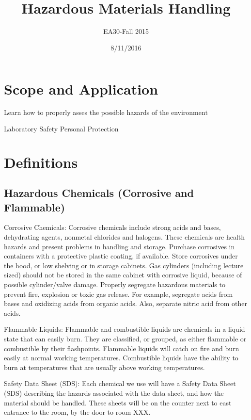\documentclass[12pt]{../SOP2}
\title{Hazardous Materials Handling}
\date{8/11/2016}
\author{EA30-Fall 2015}
\begin{document}


\maketitle

\section{Scope and Application}

\NP Learn how to properly asses the possible hazards of the environment

\NP Laboratory Safety
Personal Protection

\section{Definitions}

\subsection{Hazardous Chemicals (Corrosive and Flammable)}

\NP Corrosive Chemicals: Corrosive chemicals include strong acids and bases, dehydrating agents, nonmetal chlorides and halogens. These chemicals are health hazards and present problems in handling and storage. Purchase corrosives in containers with a protective plastic coating, if available.  Store corrosives under the hood, or low shelving or in storage cabinets. Gas cylinders (including lecture sized) should not be stored in the same cabinet with corrosive liquid, because of possible cylinder/valve damage.  Properly segregate hazardous materials to prevent fire, explosion or toxic gas release. For example, segregate acids from bases and oxidizing acids from organic acids. Also, separate nitric acid from other acids. 

\NP Flammable Liquids: Flammable and combustible liquids are chemicals in a liquid state that can easily burn. They are classified, or grouped, as either flammable or combustible by their flashpoints. Flammable liquids will catch on fire and burn easily at normal working temperatures. Combustible liquids have the ability to burn at temperatures that are usually above working temperatures.

\NP Safety Data Sheet (SDS): Each chemical we use will have a Safety Data Sheet (SDS) describing the hazards associated with the data sheet, and how the material should be handled. These sheets will be on the counter next to east entrance to the room, by the door to room XXX. 
\end{document}
